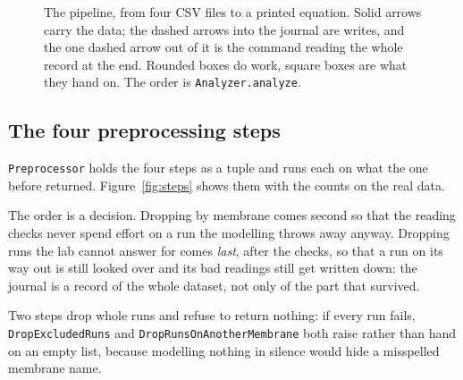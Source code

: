 \begin{figure}[htbp]
\caption{The pipeline, from four CSV files to a printed equation. Solid arrows carry the
data; the dashed arrows into the journal are writes, and the one dashed arrow out of it is
the command reading the whole record at the end. Rounded boxes do work, square boxes are
what they hand on. The order is
\texttt{Analyzer.analyze}.}
\label{fig:pipeline}
\end{figure}

\subsection{The four preprocessing steps}

\texttt{Preprocessor} holds the four steps as a tuple and runs each on what the one before
returned. Figure~\ref{fig:steps} shows them with the counts on the real data.

The order is a decision. Dropping by membrane comes second so that the reading checks never
spend effort on a run the modelling throws away anyway. Dropping runs the lab cannot answer
for comes \emph{last}, after the checks, so that a run on its way out is still looked over
and its bad readings still get written down: the journal is a record of the whole dataset,
not only of the part that survived.

Two steps drop whole runs and refuse to return nothing: if every run fails,
\texttt{DropExcludedRuns} and \texttt{DropRunsOnAnotherMembrane} both raise rather than hand
on an empty list, because modelling nothing in silence would hide a misspelled membrane
name.

